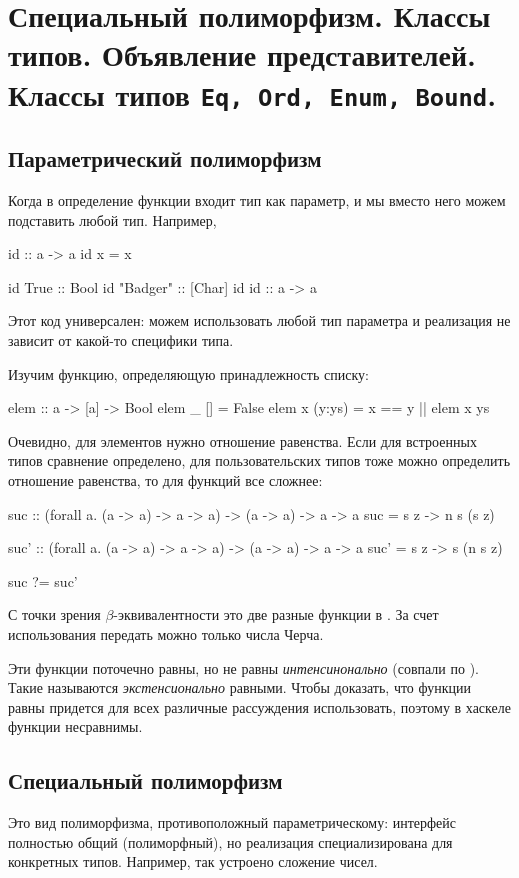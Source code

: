 \documentclass[11pt,a4paper]{article}
\begin{document}
\section{Специальный полиморфизм. Классы типов. Объявление представителей. Классы типов \texttt{Eq, Ord, Enum, Bound}.}
\subsection{Параметрический полиморфизм}
Когда в определение функции входит тип как параметр, и мы вместо него можем подставить любой тип. Например,
\begin{hscode}
id :: a -> a
id x = x

id True     :: Bool
id "Badger" :: [Char]
id id       :: a -> a
\end{hscode}
Этот код универсален: можем использовать любой тип параметра и реализация не зависит от какой-то специфики типа.

Изучим функцию, определяющую принадлежность списку:
\begin{hscode}
elem :: a -> [a] -> Bool
elem _ [] = False
elem x (y:ys) = x == y || elem x ys
\end{hscode}
Очевидно, для элементов нужно отношение равенства. Если для встроенных типов сравнение определено, для пользовательских типов тоже можно определить отношение равенства, то для функций все сложнее:
\begin{hscode}
suc :: (forall a. (a -> a) -> a -> a) -> (a -> a) -> a -> a
suc = \n s z -> n s (s z)

suc' :: (forall a. (a -> a) -> a -> a) -> (a -> a) -> a -> a
suc' = \n s z -> s (n s z)

suc ?= suc'
\end{hscode}
С точки зрения $ \beta $-эквивалентности это две разные функции в \bNF. За счет использования  передать можно только числа Черча.

Эти функции поточечно равны, но не равны \textit{интенсинонально} (совпали по \bNF). Такие называются \textit{экстенсионально} равными.
Чтобы доказать, что функции равны придется для всех различные рассуждения использовать, поэтому в хаскеле функции несравнимы. 

\subsection{Специальный полиморфизм}
Это вид полиморфизма, противоположный параметрическому: интерфейс полностью общий (полиморфный), но реализация специализирована для конкретных типов. Например, так устроено сложение чисел.
\end{document}
